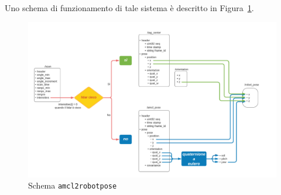 Uno schema di funzionamento di tale sistema è descritto in Figura~\ref{fig:amcl2robotpose}.

\begin{figure}[h] 
\centering    
\includegraphics[width=1\textwidth]{Capitolo2/Figs/schema_amcl2robotpose.pdf}
\caption[Schema \texttt{amcl2robotpose}]{Schema \texttt{amcl2robotpose}}
\label{fig:amcl2robotpose}
\end{figure}